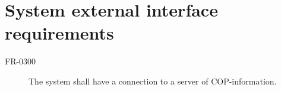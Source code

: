 \section{System external interface requirements}

\begin{description}
  \item[FR-0300] The system shall have a connection to a server of COP-information.

\end{description}